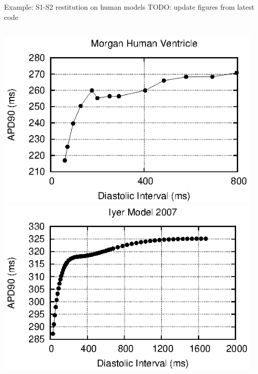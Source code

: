 \documentclass[t,xcolor={usenames,dvipsnames}]{beamer}
\begin{document}
\begin{frame}{Example: S1-S2 restitution on human models}
TODO: update figures from latest code
\begin{columns}[T]
\begin{column}{.33\linewidth}
\begin{center}
\includegraphics[width=\textwidth]{morgan_human_ventricle_s1s2_curve}\\
\vspace{.1cm}
\includegraphics[width=\textwidth]{iyer_model_2007_s1s2_curve}
\end{center}
\end{column}
\begin{column}{.33\linewidth}
\begin{center}

\end{center}
\end{column}
\end{columns}
\end{frame}
\end{document}
